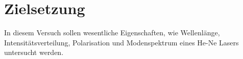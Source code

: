 \section{Zielsetzung}
In diesem Versuch sollen wesentliche Eigenschaften, wie Wellenlänge, Intensitätsverteilung, Polarisation und Modenspektrum eines
He-Ne Lasers untersucht werden.
\label{sec:Zielsetzung}
